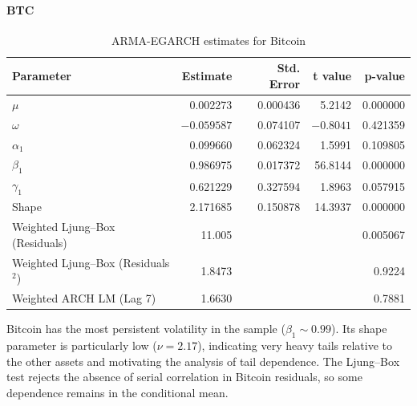 \documentclass[12pt,a4paper]{article}
\begin{document}
\paragraph{BTC}
\begin{table}[H]
\centering
\begin{tabular}{lrrrr}
\toprule
Parameter & Estimate & Std. Error & t value & p-value \\
\midrule
$\mu$ & 0.002273 & 0.000436 & 5.2142 & 0.000000 \\
$\omega$ & $-0.059587$ & 0.074107 & $-0.8041$ & 0.421359 \\
$\alpha_1$ & 0.099660 & 0.062324 & 1.5991 & 0.109805 \\
$\beta_1$ & 0.986975 & 0.017372 & 56.8144 & 0.000000 \\
$\gamma_1$ & 0.621229 & 0.327594 & 1.8963 & 0.057915 \\
Shape & 2.171685 & 0.150878 & 14.3937 & 0.000000 \\
\midrule
Weighted Ljung--Box (Residuals) & 11.005 & & & 0.005067 \\
Weighted Ljung--Box (Residuals$^2$) & 1.8473 & & & 0.9224 \\
Weighted ARCH LM (Lag 7) & 1.6630 & & & 0.7881 \\
\bottomrule
\end{tabular}
\caption{ARMA-EGARCH estimates for Bitcoin}
\end{table}
Bitcoin has the most persistent volatility in the sample ($\beta_1 \sim 0.99$). Its shape parameter is particularly low ($\nu=2.17$), indicating very heavy tails relative to the other assets and motivating the analysis of tail dependence.
The Ljung--Box test rejects the absence of serial correlation in Bitcoin residuals, so some dependence remains in the conditional mean.
\end{document}
